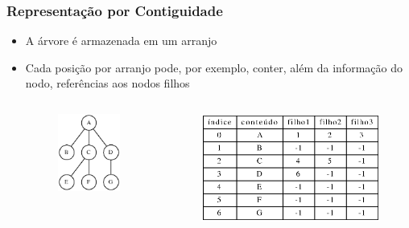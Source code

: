 \documentclass[aspectratio=169]{beamer}
\begin{document}
\begin{frame}[fragile]\frametitle{Representação por Contiguidade}
\begin{itemize}
	\item A árvore é armazenada em um arranjo
	\item Cada posição por arranjo pode, por exemplo, conter, além da informação do nodo, referências aos nodos filhos
\begin{columns}[T]
\begin{column}{0.30\linewidth}
\begin{figure}[h]
	\centering
	\includegraphics[height=0.4\paperheight]{imagens/arvore_a.eps}
\end{figure}
\end{column}
\begin{column}{0.70\linewidth}
\begin{figure}[h]
	\centering
	\includegraphics[height=0.4\paperheight]{imagens/arvore_a-cont.eps}

\end{figure}
\end{column}
\end{columns}
\end{itemize}
\end{frame}
\end{document}

